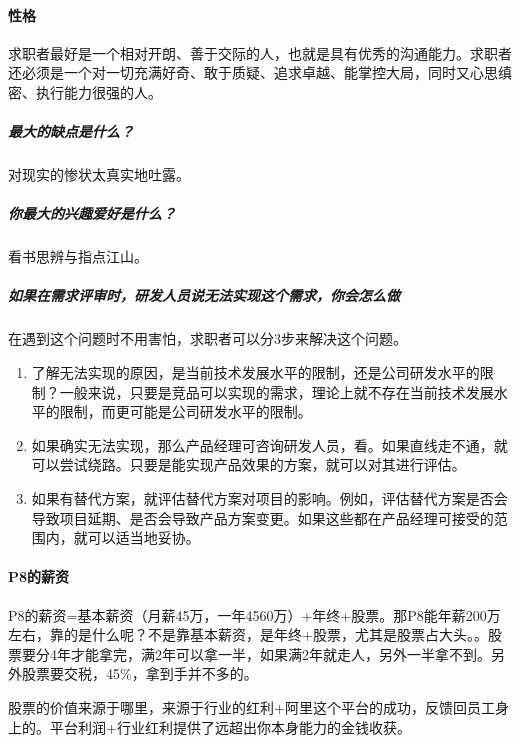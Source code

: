 \documentclass[letterpaper,11pt,english]{sphinxmanual}
\begin{document}
\paragraph{性格}
\label{\detokenize{chapter_interview/HR:id4}}
求职者最好是一个相对开朗、善于交际的人，也就是具有优秀的沟通能力。求职者还必须是一个对一切充满好奇、敢于质疑、追求卓越、能掌控大局，同时又心思缜密、执行能力很强的人。


\subparagraph{最大的缺点是什么？}
\label{\detokenize{chapter_interview/HR:id5}}
对现实的惨状太真实地吐露。


\subparagraph{你最大的兴趣爱好是什么？}
\label{\detokenize{chapter_interview/HR:id6}}
看书思辨与指点江山。


\subparagraph{如果在需求评审时，研发人员说无法实现这个需求，你会怎么做}
\label{\detokenize{chapter_interview/HR:id7}}
在遇到这个问题时不用害怕，求职者可以分3步来解决这个问题。
\begin{enumerate}
%
\item {} 
了解无法实现的原因，是当前技术发展水平的限制，还是公司研发水平的限制？一般来说，只要是竞品可以实现的需求，理论上就不存在当前技术发展水平的限制，而更可能是公司研发水平的限制。

\item {} 
如果确实无法实现，那么产品经理可咨询研发人员，看。如果直线走不通，就可以尝试绕路。只要是能实现产品效果的方案，就可以对其进行评估。

\item {} 
如果有替代方案，就评估替代方案对项目的影响。例如，评估替代方案是否会导致项目延期、是否会导致产品方案变更。如果这些都在产品经理可接受的范围内，就可以适当地妥协。

\end{enumerate}


\paragraph{P8的薪资}
\label{\detokenize{chapter_interview/HR:p8}}
P8的薪资=基本薪资（月薪4\sphinxhyphen{}5万，一年45\sphinxhyphen{}60万）+年终+股票。那P8能年薪200万左右，靠的是什么呢？不是靠基本薪资，是年终+股票，尤其是股票占大头。。股票要分4年才能拿完，满2年可以拿一半，如果满2年就走人，另外一半拿不到。另外股票要交税，45\%，拿到手并不多的。

股票的价值来源于哪里，来源于行业的红利+阿里这个平台的成功，反馈回员工身上的。平台利润+行业红利提供了远超出你本身能力的金钱收获。
\end{document}
